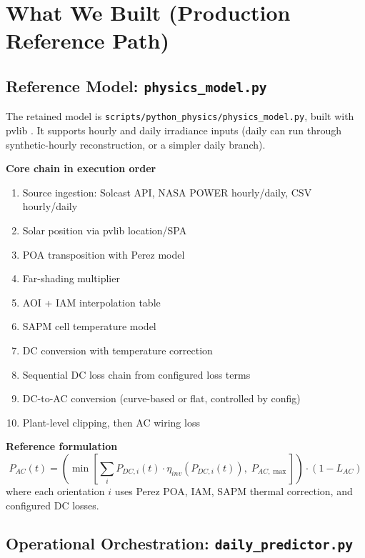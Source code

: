 \documentclass[11pt,a4paper]{article}
\newcommand{\artifact}[1]{\texttt{#1}}
\begin{document}
\section{What We Built (Production Reference Path)}

\subsection{Reference Model: \artifact{physics\_model.py}}

The retained model is \artifact{scripts/python\_physics/physics\_model.py}, built with pvlib \cite{holmgren2018pvlib}.
It supports hourly and daily irradiance inputs (daily can run through synthetic-hourly reconstruction, or a simpler daily branch).

\textbf{Core chain in execution order}
\begin{enumerate}
  \item Source ingestion: Solcast API, NASA POWER hourly/daily, CSV hourly/daily
  \item Solar position via pvlib location/SPA \cite{reda2004solar}
  \item POA transposition with Perez model \cite{perez1990set}
  \item Far-shading multiplier
  \item AOI + IAM interpolation table
  \item SAPM cell temperature model \cite{king2004photovoltaic}
  \item DC conversion with temperature correction
  \item Sequential DC loss chain from configured loss terms
  \item DC-to-AC conversion (curve-based or flat, controlled by config)
  \item Plant-level clipping, then AC wiring loss
\end{enumerate}

\textbf{Reference formulation}
\[
P_{AC}(t)=
\left(
\min\left[
\sum_i P_{DC,i}(t)\cdot \eta_{inv}(P_{DC,i}(t)),\;
P_{AC,\max}
\right]
\right)\cdot(1-L_{AC})
\]
where each orientation $i$ uses Perez POA, IAM, SAPM thermal correction, and configured DC losses.

\subsection{Operational Orchestration: \artifact{daily\_predictor.py}}
\end{document}
